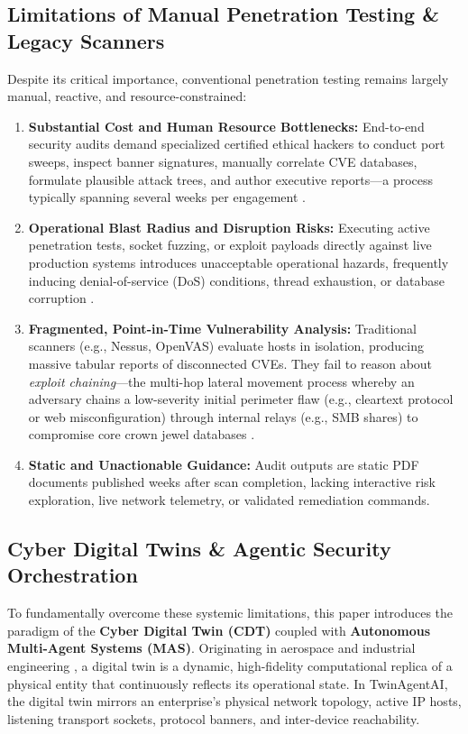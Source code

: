 \documentclass[conference]{IEEEtran}
\begin{document}
\subsection{Limitations of Manual Penetration Testing \& Legacy Scanners}
Despite its critical importance, conventional penetration testing remains largely manual, reactive, and resource-constrained:
\begin{enumerate}
    \item \textbf{Substantial Cost and Human Resource Bottlenecks:} End-to-end security audits demand specialized certified ethical hackers to conduct port sweeps, inspect banner signatures, manually correlate CVE databases, formulate plausible attack trees, and author executive reports---a process typically spanning several weeks per engagement \cite{shanahan2024large}.
    \item \textbf{Operational Blast Radius and Disruption Risks:} Executing active penetration tests, socket fuzzing, or exploit payloads directly against live production systems introduces unacceptable operational hazards, frequently inducing denial-of-service (DoS) conditions, thread exhaustion, or database corruption \cite{ammann2002scalable}.
    \item \textbf{Fragmented, Point-in-Time Vulnerability Analysis:} Traditional scanners (e.g., Nessus, OpenVAS) evaluate hosts in isolation, producing massive tabular reports of disconnected CVEs. They fail to reason about \textit{exploit chaining}---the multi-hop lateral movement process whereby an adversary chains a low-severity initial perimeter flaw (e.g., cleartext protocol or web misconfiguration) through internal relays (e.g., SMB shares) to compromise core crown jewel databases \cite{noel2004managing}.
    \item \textbf{Static and Unactionable Guidance:} Audit outputs are static PDF documents published weeks after scan completion, lacking interactive risk exploration, live network telemetry, or validated remediation commands.
\end{enumerate}

\subsection{Cyber Digital Twins \& Agentic Security Orchestration}
To fundamentally overcome these systemic limitations, this paper introduces the paradigm of the \textbf{Cyber Digital Twin (CDT)} coupled with \textbf{Autonomous Multi-Agent Systems (MAS)}. Originating in aerospace and industrial engineering \cite{grieves2017digital}, a digital twin is a dynamic, high-fidelity computational replica of a physical entity that continuously reflects its operational state. In TwinAgentAI, the digital twin mirrors an enterprise's physical network topology, active IP hosts, listening transport sockets, protocol banners, and inter-device reachability.
\end{document}
